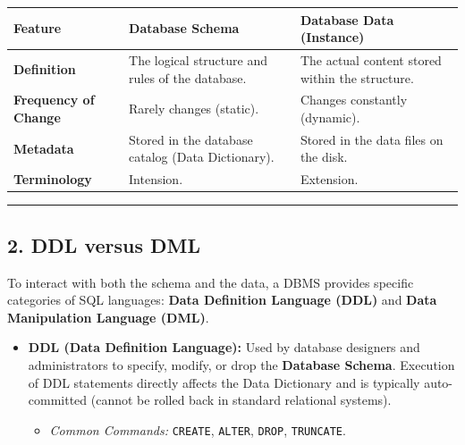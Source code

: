 \documentclass[12pt,a3paper]{article}
\begin{document}
\begin{enumerate}
\begin{tcolorbox}[enhanced,breakable,ansbox,colback=cA!4,colframe=cA,boxrule=0.8pt,arc=5pt,title={\textbf{Answer}},fonttitle=\bfseries\color{white},colbacktitle=cA]
\begin{center}
\end{center}
\vspace{1em}

\begin{center}
\renewcommand{\arraystretch}{1.4}
\begin{tabularx}{\textwidth}{@{} >{\bfseries}l X X @{}}
\toprule
Feature & Database Schema & Database Data (Instance) \\
\midrule
\textbf{Definition} & The logical structure and rules of the database. & The actual content stored within the structure. \\
\textbf{Frequency of Change} & Rarely changes (static). & Changes constantly (dynamic). \\
\textbf{Metadata} & Stored in the database catalog (Data Dictionary). & Stored in the data files on the disk. \\
\textbf{Terminology} & Intension. & Extension. \\
\bottomrule
\end{tabularx}
\end{center}

\vspace{1em}
\hrule
\vspace{1em}

\subsection*{2. DDL versus DML}

To interact with both the schema and the data, a DBMS provides specific categories of SQL languages: \textbf{Data Definition Language (DDL)} and \textbf{Data Manipulation Language (DML)}.

\begin{itemize}
    \item \textbf{DDL (Data Definition Language):} Used by database designers and administrators to specify, modify, or drop the \textbf{Database Schema}. Execution of DDL statements directly affects the Data Dictionary and is typically auto-committed (cannot be rolled back in standard relational systems).
    \begin{itemize}
        \item \textit{Common Commands:} \texttt{CREATE}, \texttt{ALTER}, \texttt{DROP}, \texttt{TRUNCATE}.
    \end{itemize}
    

\end{itemize}
\end{tcolorbox}
\end{enumerate}
\end{document}
